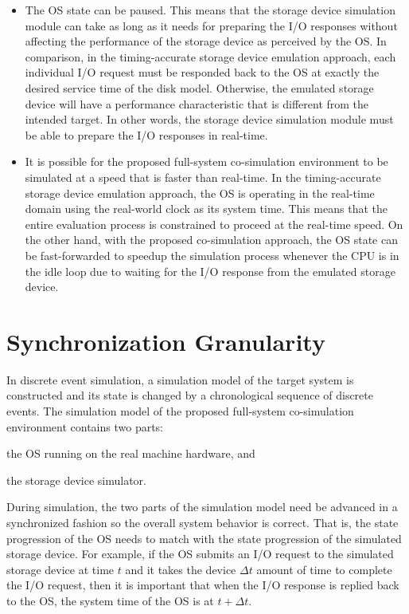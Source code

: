 \begin{itemize}
	\item The OS state can be paused. This means that the storage device simulation module can take as long as it needs for preparing the I/O responses without affecting the performance of the storage device as perceived by the OS. In comparison, in the timing-accurate storage device emulation approach, each individual I/O request must be responded back to the OS at exactly the desired service time of the disk model. Otherwise, the emulated storage device will have a performance characteristic that is different from the intended target. In other words, the storage device simulation module must be able to prepare the I/O responses in real-time.

	\item It is possible for the proposed full-system co-simulation environment to be simulated at a speed that is faster than real-time. In the timing-accurate storage device emulation approach, the OS is operating in the real-time domain using the real-world clock as its system time. This means that the entire evaluation process is constrained to proceed at the real-time speed. On the other hand, with the proposed co-simulation approach, the OS state can be fast-forwarded to speedup the simulation process whenever the CPU is in the idle loop due to waiting for the I/O response from the emulated storage device.
\end{itemize}

\section{Synchronization Granularity}
\label{sec:synchronization-granularity}

In discrete event simulation, a simulation model of the target system is constructed and its state is changed by a chronological sequence of discrete events. The simulation model of the proposed full-system co-simulation environment contains two parts:
\begin{enumerate*}[label=(\roman*)]
	\item the OS running on the real machine hardware, and
	\item the storage device simulator.
\end{enumerate*}
During simulation, the two parts of the simulation model need be advanced in a synchronized fashion so the overall system behavior is correct. That is, the state progression of the OS needs to match with the state progression of the simulated storage device. For example, if the OS submits an I/O request to the simulated storage device at time $t$ and it takes the
device $\Delta t$ amount of time to complete the I/O request, then it is important that when the I/O response is replied back to the OS, the system time of the OS is at $t + \Delta t$.


